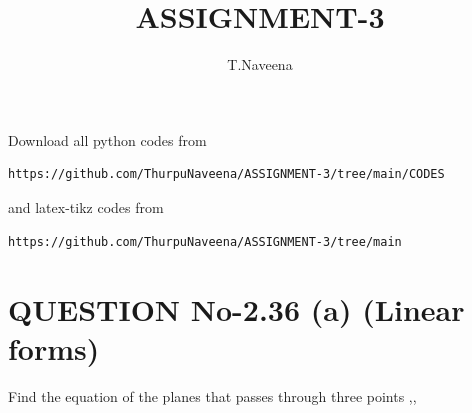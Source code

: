 \documentclass[journal,12pt,twocolumn]{IEEEtran}
\begin{document}
     \def\rightbox#1{\makebox[0in][r]{#1}}
     \def\centbox#1{\makebox[0in]{#1}}
     \def\topbox#1{\raisebox{-\baselineskip}[0in][0in]{#1}}
     \def\midbox#1{\raisebox{-0.5\baselineskip}[0in][0in]{#1}}
\vspace{3cm}
\title{ASSIGNMENT-3}
\author{T.Naveena}
\maketitle
\newpage
\bigskip
\renewcommand{\thefigure}{\theenumi}
\renewcommand{\thetable}{\theenumi}
Download all python codes from 
\begin{lstlisting}
https://github.com/ThurpuNaveena/ASSIGNMENT-3/tree/main/CODES
\end{lstlisting}
%
and latex-tikz codes from 
%
\begin{lstlisting}
https://github.com/ThurpuNaveena/ASSIGNMENT-3/tree/main
\end{lstlisting}
%
%
\section{QUESTION No-2.36 (a) (Linear forms)}
Find the equation of the planes that passes through three points 
,,
%
\end{document}

